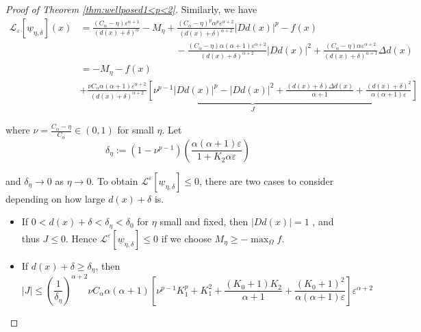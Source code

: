 \documentclass[12pt,reqno]{amsart}
\numberwithin{figure}{section}
\theoremstyle{plain}
\theoremstyle{remark}
\numberwithin{equation}{section}
\begin{document}
\begin{appendices}
\begin{proof} [Proof of Theorem \ref{thm:wellposed1<p<2}]
Similarly, we have 
\begin{align*}
    \mathcal{L}_\varepsilon\left[\underline{w}_{\eta,\delta}\right](x) &= \frac{ (C_\alpha - \eta)\varepsilon^{\alpha+1}}{(d(x)+\delta)^\alpha} - M_\eta + \frac{(C_\alpha-\eta)^p \alpha^p\varepsilon^{\alpha+2}}{(d(x)+\delta)^{\alpha+2}}|D d(x)|^p - f(x) \\
    & \qquad\qquad\qquad\qquad\qquad - \frac{(C_\alpha-\eta)\alpha(\alpha+1)\varepsilon^{\alpha+2}}{(d(x)+\delta)^{\alpha+2}}|D d(x)|^2 + \frac{(C_\alpha-\eta)\alpha \varepsilon^{\alpha+2}}{(d(x)+\delta)^{\alpha+1}}\Delta d(x)\\
    &= - M_\eta - f(x) \\
    &+\underbrace{\frac{\nu C_\alpha\alpha(\alpha+1)\varepsilon^{\alpha+2}}{(d(x)+\delta)^{\alpha+2}}\left[\nu^{p-1}|Dd(x)|^{p} - |Dd(x)|^2 + \frac{(d(x)+\delta)\Delta d(x)}{\alpha+1}+\frac{(d(x)+\delta)^2}{\alpha(\alpha+1)\varepsilon}\right]}_{J}
\end{align*}

where $\nu = \frac{C_\alpha-\eta}{C_\alpha}\in (0,1)$ for small $\eta$. Let
\begin{equation*}
    \delta_\eta := \left(1-\nu^{p-1}\right)\left(\frac{\alpha(\alpha+1)\varepsilon}{1+K_2\alpha\varepsilon}\right) 
\end{equation*}

and $\delta_\eta \to 0$ as $ \eta \to 0$.
To obtain $\mathcal{L}^\varepsilon\left[\underline{w}_{\eta,\delta}\right]\leq 0$, there are two cases to consider depending on how large $d(x)+\delta$ is.
\begin{itemize}
    \item If $0<d(x)+\delta<\delta_\eta < \delta_0$ for $\eta$ small and fixed, then $|Dd(x)| = 1$ , and thus $J\leq 0$. Hence $\mathcal{L}^\varepsilon\left[\underline{w}_{\eta,\delta}\right]\leq 0$ if we choose $M_\eta \geq -\max_{\Omega}f$.
    \item If $d(x)+\delta\geq \delta_\eta$, then
    \begin{equation*}
        |J|\leq \left(\frac{1}{\delta_\eta}\right)^{\alpha+2} \nu C_\alpha\alpha(\alpha+1)\left[\nu^{p-1}K_1^{p}+K_1^2 + \frac{(K_0+1)K_2}{\alpha+1} + \frac{(K_0+1)^2}{\alpha(\alpha+1)\varepsilon}\right]\varepsilon^{\alpha+2}
    \end{equation*}
    

\end{itemize}
\end{proof}
\end{appendices}
\end{document}
